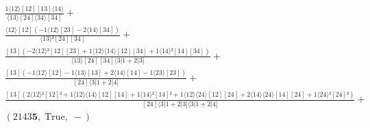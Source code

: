 \documentclass[varwidth, border=5pt]{standalone}
\begin{document}
\begin{my}
$\begin{gathered}
\scriptscriptstyle\frac{1⟨12⟩[12][13]⟨14⟩}{⟨13⟩[24]⟨34⟩[34]} +\\
\scriptscriptstyle\frac{⟨12⟩[12](-1⟨12⟩[23]-2⟨14⟩[34])}{⟨13⟩²[24][34]} +\\
\scriptscriptstyle\frac{[13](-2⟨12⟩²[12][23]+1⟨12⟩⟨14⟩[12][34]+1⟨14⟩²[14][34])}{⟨13⟩[24][34]⟨3|1+2|3]} +\\
\scriptscriptstyle\frac{[13](-1⟨12⟩[12]-1⟨13⟩[13]+2⟨14⟩[14]-1⟨23⟩[23])}{[24]⟨3|1+2|4]} +\\
\scriptscriptstyle\frac{[13](2⟨12⟩²[12]²+1⟨12⟩⟨14⟩[12][14]+1⟨14⟩²[14]²+1⟨12⟩⟨24⟩[12][24]+2⟨14⟩⟨24⟩[14][24]+1⟨24⟩²[24]²)}{[24]⟨3|1+2|3]⟨3|1+2|4]} +\\
\scriptscriptstyle(2143𝟓,\;\text{True},\;-) \phantom{+}
\end{gathered}$
\end{my}
\end{document}
